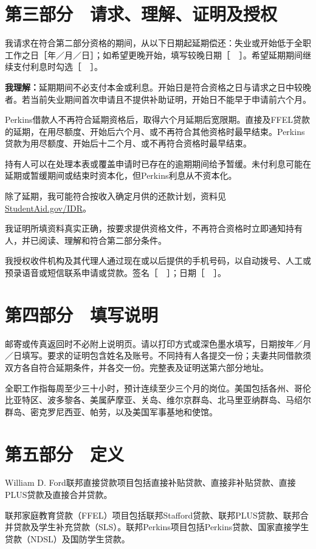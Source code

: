 \documentclass[UTF8,fontset=none,11pt,a4paper]{ctexart}
\begin{document}
\section*{第三部分　请求、理解、证明及授权}
我请求在符合第二部分资格的期间，从以下日期起延期偿还：失业或开始低于全职工作之日［年／月／日］；如希望更晚开始，填写较晚日期［　］。希望延期期间继续支付利息时勾选［　］。


\textbf{我理解：}延期期间不必支付本金或利息。开始日是符合资格之日与请求之日中较晚者。若当前失业期间首次申请且不提供补助证明，开始日不能早于申请\allowbreak\mbox{前六个月。}


Perkins借款人不再符合延期资格后，取得六个月延期后宽限期。直接及FFEL贷款的延期，在用尽额度、开始后六个月、或不再符合其他资格时最早结束。Perkins贷款为用尽额度、开始后十二个月、或不再符合资格时\allowbreak\mbox{最早结束。}


持有人可以在处理本表或覆盖申请时已存在的逾期期间给予暂缓。未付利息可能在延期或暂缓期间或结束时资本化，但Perkins利息从\allowbreak\mbox{不资本化。}


除了延期，我可能符合按收入确定月供的还款计划，资料见\url{StudentAid.gov/IDR}。


我证明所填资料真实正确，按要求提供资格文件，不再符合资格时立即通知持有人，并已阅读、理解和符合第二\allowbreak\mbox{部分条件。}


我授权收件机构及其代理人通过现在或以后提供的手机号码，以自动拨号、人工或预录语音或短信联系申请或贷款。签名［　］；日期［　］。


\section*{第四部分　填写说明}
邮寄或传真返回时不必附上说明页。请以打印方式或深色墨水填写，日期按年／月／日填写。要求的证明包含姓名及账号。不同持有人各提交一份；夫妻共同借款须双方各自符合延期条件，并各交一份。完整表及证明送第六部\allowbreak\mbox{分地址。}


全职工作指每周至少三十小时，预计连续至少三个月的岗位。美国包括各州、哥伦比亚特区、波多黎各、美属萨摩亚、关岛、维尔京群岛、北马里亚纳群岛、马绍尔群岛、密克罗尼西亚、帕劳，以及美国军事基\allowbreak\mbox{地和使馆。}


\section*{第五部分　定义}
William D. Ford联邦直接贷款项目包括直接补贴贷款、直接非补贴贷款、直接PLUS贷款及直接\allowbreak\mbox{合并贷款。}


联邦家庭教育贷款（FFEL）项目包括联邦Stafford贷款、联邦PLUS贷款、联邦合并贷款及学生补充贷款（SLS）。联邦Perkins项目包括Perkins贷款、国家直接学生贷款（NDSL）及国防\allowbreak\mbox{学生贷款。}
\end{document}
